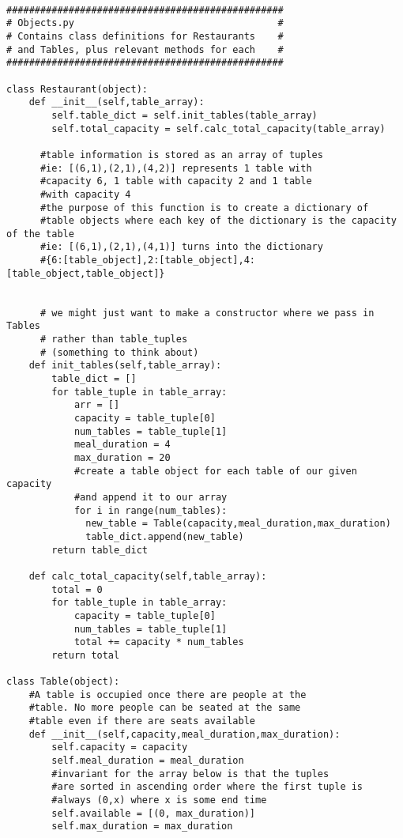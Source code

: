 \documentclass[12pt, titlepage]{article}
\begin{document}
\begin{Verbatim}[fontsize=\scriptsize]

#################################################
# Objects.py                                    #
# Contains class definitions for Restaurants    #
# and Tables, plus relevant methods for each    #
#################################################

class Restaurant(object):
    def __init__(self,table_array):
        self.table_dict = self.init_tables(table_array)
        self.total_capacity = self.calc_total_capacity(table_array)
      
      #table information is stored as an array of tuples
      #ie: [(6,1),(2,1),(4,2)] represents 1 table with
      #capacity 6, 1 table with capacity 2 and 1 table
      #with capacity 4
      #the purpose of this function is to create a dictionary of
      #table objects where each key of the dictionary is the capacity of the table
      #ie: [(6,1),(2,1),(4,1)] turns into the dictionary
      #{6:[table_object],2:[table_object],4:[table_object,table_object]}


      # we might just want to make a constructor where we pass in Tables
      # rather than table_tuples
      # (something to think about)
    def init_tables(self,table_array):
        table_dict = []
        for table_tuple in table_array:
            arr = []
            capacity = table_tuple[0]
            num_tables = table_tuple[1]
            meal_duration = 4
            max_duration = 20
            #create a table object for each table of our given capacity
            #and append it to our array
            for i in range(num_tables):
              new_table = Table(capacity,meal_duration,max_duration)
              table_dict.append(new_table)
        return table_dict
      
    def calc_total_capacity(self,table_array):
        total = 0
        for table_tuple in table_array:
            capacity = table_tuple[0]
            num_tables = table_tuple[1]
            total += capacity * num_tables
        return total
    
class Table(object):
    #A table is occupied once there are people at the
    #table. No more people can be seated at the same
    #table even if there are seats available
    def __init__(self,capacity,meal_duration,max_duration):
        self.capacity = capacity
        self.meal_duration = meal_duration
        #invariant for the array below is that the tuples
        #are sorted in ascending order where the first tuple is
        #always (0,x) where x is some end time
        self.available = [(0, max_duration)]
        self.max_duration = max_duration
    

\end{Verbatim}
\end{document}
